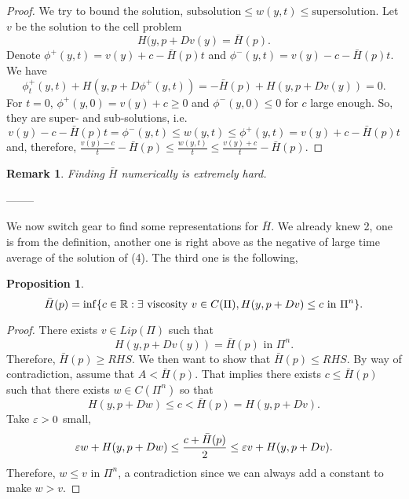 \documentclass[11pt, oneside]{amsart}   	%
\newtheorem{remark}{Remark}
\newtheorem{proposition}{Proposition}
\begin{document}
\begin{proof}
We try to bound the solution, $\text{subsolution} \le w(y,t) \le \text{supersolution}$.
Let $v$ be the solution to the cell problem
$$H(y, p+ Dv(y) = \bar{H}(p).$$
Denote $\phi^+(y,t)=v(y) + c -\bar{H}(p)t$ and $\phi^-(y,t)=v(y) - c -\bar{H}(p)t$. We have
$$\phi^+_t(y,t) + H(y, p + D\phi^+(y,t))= -\bar{H}(p) + H(y, p + Dv(y))=0.$$
For $t=0$, 
$\phi^+(y,0)=v(y)+c \ge 0$ and $\phi^-(y,0)\le 0$ for $c$ large enough. So, they are super- and sub-solutions, i.e.
$$v(y)-c-\bar{H}(p)t = \phi^-(y,t) \le w(y,t) \le \phi^+(y,t) = v(y) + c -\bar{H}(p)t$$
and, therefore,
$\frac{v(y)-c}{t}-\bar{H}(p)\le \frac{w(y,t)}{t} \le\frac{v(y)+c}{t}-\bar{H}(p).$
\end{proof}
\begin{remark}
	Finding $\bar{H}$ numerically is extremely hard.
\end{remark}
--------

We now switch gear to find some representations for $\bar{H}$. We already knew 2, one is from the definition, another one is right above as the negative of large time average of the solution of (4). The third one is the following,
\begin{proposition}
	$$\bar{H}(p)=\inf\{ c \in \mathbb{R}: \exists \text{ viscosity } v\in C(\Pi), H(y, p+Dv)\le c \text{ in }\Pi^n\}.$$
\end{proposition}
\begin{proof}
There exists $v\in Lip(\Pi)$ such that
$$H(y, p + Dv(y))=\bar{H}(p) \text{ in $\Pi^n$.}$$
Therefore, $\bar{H}(p)\ge RHS$. We then want to show that $\bar{H}(p)\le RHS$. By way of contradiction, assume that $A<\bar{H}(p)$. That implies there exists $c\le \bar{H}(p)$ such that there exists $w\in C(\Pi^n)$ so that
$$H(y, p+ Dw)\le c < \bar{H}(p)=H(y, p+ Dv).$$
Take $\varepsilon>0$ small,
$$\varepsilon w + H(y, p+ Dw)\le \frac{c+\bar{H}(p)}{2} \le \varepsilon v + H(y, p+ Dv).$$
Therefore, $w\le v$ in $\Pi^n$, a contradiction since we can always add a constant to make $w>v$.
\end{proof}
\end{document}
